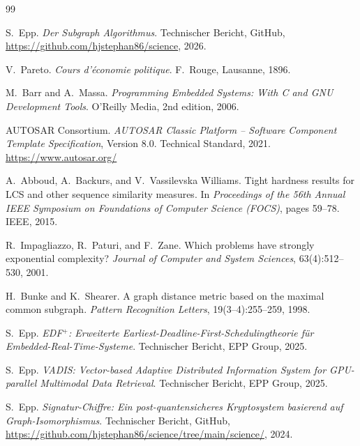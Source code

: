 ﻿\documentclass[a4paper,12pt]{article}
\theoremstyle{definition}
\begin{document}
\newpage

\begin{thebibliography}{99}

S.\ Epp.
\newblock \emph{Der Subgraph Algorithmus}.
\newblock Technischer Bericht, GitHub,
  \url{https://github.com/hjstephan86/science}, 2026.

V.\ Pareto.
\newblock \emph{Cours d'économie politique}.
\newblock F.\ Rouge, Lausanne, 1896.

M.\ Barr and A.\ Massa.
\newblock \emph{Programming Embedded Systems: With C and GNU Development Tools}.
\newblock O'Reilly Media, 2nd edition, 2006.

AUTOSAR Consortium.
\newblock \emph{AUTOSAR Classic Platform -- Software Component Template
  Specification}, Version 8.0.
\newblock Technical Standard, 2021.
  \url{https://www.autosar.org/}

A.\ Abboud, A.\ Backurs, and V.\ Vassilevska Williams.
\newblock Tight hardness results for {LCS} and other sequence similarity measures.
\newblock In \emph{Proceedings of the 56th Annual IEEE Symposium on Foundations
  of Computer Science (FOCS)}, pages 59--78. IEEE, 2015.

R.\ Impagliazzo, R.\ Paturi, and F.\ Zane.
\newblock Which problems have strongly exponential complexity?
\newblock \emph{Journal of Computer and System Sciences}, 63(4):512--530, 2001.

H.\ Bunke and K.\ Shearer.
\newblock A graph distance metric based on the maximal common subgraph.
\newblock \emph{Pattern Recognition Letters}, 19(3--4):255--259, 1998.

S.\ Epp.
\newblock \emph{EDF$^+$: Erweiterte Earliest-Deadline-First-Schedulingtheorie
  f\"{u}r Embedded-Real-Time-Systeme}.
\newblock Technischer Bericht, EPP Group, 2025.

S.\ Epp.
\newblock \emph{VADIS: Vector-based Adaptive Distributed Information System
  for GPU-parallel Multimodal Data Retrieval}.
\newblock Technischer Bericht, EPP Group, 2025.

S.\ Epp.
\newblock \emph{Signatur-Chiffre: Ein post-quantensicheres Kryptosystem
  basierend auf Graph-Isomorphismus}.
\newblock Technischer Bericht, GitHub,
  \url{https://github.com/hjstephan86/science/tree/main/science/}, 2024.


\end{thebibliography}
\end{document}
